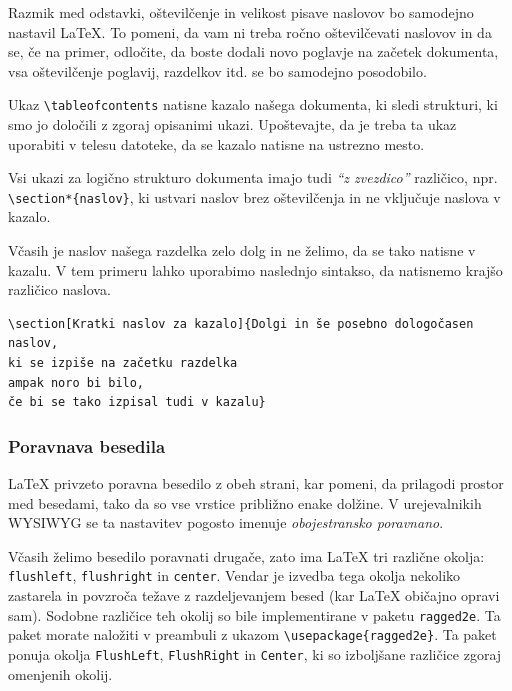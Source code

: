 Razmik med odstavki, oštevilčenje in velikost pisave naslovov bo samodejno nastavil LaTeX. To pomeni, da vam ni treba ročno oštevilčevati naslovov in da se, če na primer, odločite, da boste dodali novo poglavje na začetek dokumenta, vsa oštevilčenje poglavij, razdelkov itd. se bo samodejno posodobilo.

Ukaz \texttt{{\textbackslash}tableofcontents} natisne kazalo našega dokumenta, ki sledi strukturi, ki smo jo določili z zgoraj opisanimi ukazi.
Upoštevajte, da je treba ta ukaz uporabiti v telesu datoteke, da se kazalo natisne na ustrezno mesto.

Vsi ukazi za logično strukturo dokumenta imajo tudi \textit{``z zvezdico''} različico, npr. \texttt{{\textbackslash}section*\{naslov\}}, ki ustvari naslov brez oštevilčenja in ne vključuje naslova v kazalo.

Včasih je naslov našega razdelka zelo dolg in ne želimo, da se tako natisne v kazalu. V tem primeru lahko uporabimo naslednjo sintakso, da natisnemo krajšo različico naslova.

\begin{verbatim}
\section[Kratki naslov za kazalo]{Dolgi in še posebno dologočasen naslov,
ki se izpiše na začetku razdelka
ampak noro bi bilo,
če bi se tako izpisal tudi v kazalu}
\end{verbatim}

\subsubsection{Poravnava besedila}\label{latexOsnovnaOkolja_poravnavaBesedila}

LaTeX privzeto poravna besedilo z obeh strani, kar pomeni, da prilagodi prostor med besedami, tako da so vse vrstice približno enake dolžine.
V urejevalnikih WYSIWYG se ta nastavitev pogosto imenuje \textit{obojestransko poravnano}.

Včasih želimo besedilo poravnati drugače, zato ima LaTeX tri različne okolja: \texttt{flushleft}, \texttt{flushright} in \texttt{center}.
Vendar je izvedba tega okolja nekoliko zastarela in povzroča težave z razdeljevanjem besed (kar LaTeX običajno opravi sam).
Sodobne različice teh okolij so bile implementirane v paketu \texttt{ragged2e}.
Ta paket morate naložiti v preambuli z ukazom \texttt{{\textbackslash}usepackage\{ragged2e\}}.
Ta paket ponuja okolja \texttt{FlushLeft}, \texttt{FlushRight} in \texttt{Center}, ki so izboljšane različice zgoraj omenjenih okolij.

